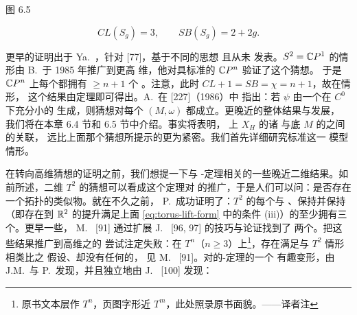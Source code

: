 \noindent\begin{minipage}{\linewidth}
\centering
{}

图 6.5
\end{minipage}

\[
CL(S_{g})=3,\qquad SB(S_{g})=2+2g.
\]

更早的证明出于 Ya.~\trEliashberg{}，针对\trSurface{} [77]，基于不同的思想%
且从未%
发表。$S^{2}=\mathbb{C} P^{1}$ 的情形由 B.~\trFortune [93, 94] 于 1985 年推广到更高%
维，他对具标准\trSymplecticStructure{}的 $\mathbb{C} P^{n}$ 验证了这个猜想。%
于是 $\mathbb{C} P^{n}$ 上每个\trHamiltonianMap{}都拥有 $\geq n+1$ 个%
\trFixedPoint。注意，此时 $CL+1=SB=\chi=n+1$，故在\trNondegenerate{}情形，%
这个结果由\trLefschetz{}定理即可得出。A.~\trWeinstein{}在 [227]（1986）中%
指出：若\trHamiltonianMap{} $\psi$ 由一个在 $C^{0}$ \trNorm{}下充分小的%
\trHamiltonianVectorField{}生成，则\trArnold{}猜想对每个%
\trSymplecticManifold{} $(M,\omega)$ 都成立。更晚近的整体结果与发展，%
我们将在本章 6.4 节和 6.5 节中介绍。事实将表明，\trCompact%
\trSymplecticManifold{}上\trHamiltonianVectorField{} $X_{H}$ 的诸%
\trForcedOscillation{}与底\trManifold{} $M$ 的\trTopology{}之间的关联，%
远比上面那个猜想所提示的更为紧密。我们首先详细研究标准\trTorus{}这一%
模型情形。

在转向高维\trArnold{}猜想的证明之前，我们想提一下与%
\trPoincare-\trBirkhoff{}定理相关的一些晚近二维结果。如前所述，二维%
\trTorus{} $T^{2}$ 的\trArnold{}猜想可以看成这个定理对\trDiffeomorphism{}%
的推广，于是人们可以问：是否存在一个拓扑的类似物。就在不久之前，%
P.~\trLeCalvez [139] 成功证明了：$T^{2}$ 的每个与\trIdentityMap%
\trHomotopic、保持\trRegular\trMeasure{}并保持\trCenterOfMass{}（即存在到%
$\mathbb{R}^{2}$ 的提升满足上面 \eqref{eq:torus-lift-form}%
中的条件 (iii)）的\trHomeomorphism{}至少拥有三个\trFixedPoint。更早一些，%
M.~\trFlucher{} [91] 通过扩展 J.~\trFranks{} [96, 97] 的技巧与论证找到了%
两个\trFixedPoint。把这些结果推广到高维\trTorus{}之\trHomeomorphism{}的%
尝试注定失败：在 $T^{n}$（$n\geq3$）上\footnote{原书文本层作 $T^{n}$，页图字形近 $T^{m}$，此处照录原书面貌。——译者注}，存在满足与 $T^{2}$ 情形相类比之%
假设、却没有任何\trFixedPoint{}的\trMeasurePreserving\trDiffeomorphism，%
见%
M.~\trFlucher{} [91]。对\trAnnulus{}的\trPoincare-\trBirkhoff{}定理的一个%
有趣变形，由 J.M.~\trGambaudo{}与 P.~\trLeCalvez [103] 发现，并且独立地由%
J.~\trFranks{} [100] 发现：

